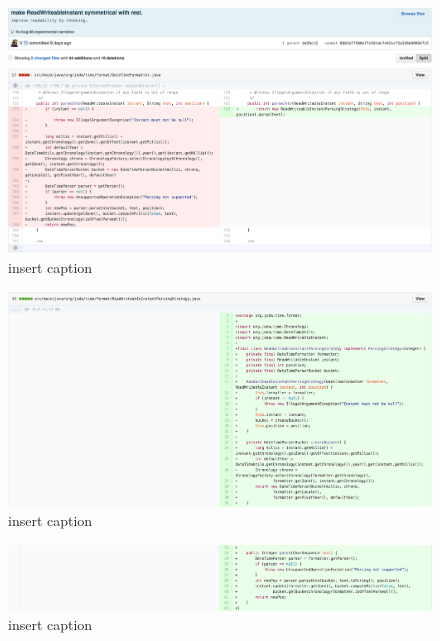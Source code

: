 \begin{figure}[H]
	\centering
	\includegraphics[width=\linewidth]{code111}
	\caption{insert caption}
\end{figure}
\begin{figure}[H]
	\centering
	\includegraphics[width=\linewidth]{code112}
	\caption{insert caption}
\end{figure}
\begin{figure}[H]
	\centering
	\includegraphics[width=\linewidth]{code113}
	\caption{insert caption}
\end{figure}

